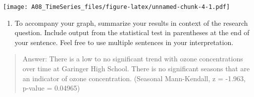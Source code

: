 \documentclass[]{article}
\newenvironment{Shaded}{\begin{snugshade}}{\end{snugshade}}
\newcommand{\CommentTok}[1]{\textcolor[rgb]{0.56,0.35,0.01}{\textit{#1}}}
\newcommand{\DataTypeTok}[1]{\textcolor[rgb]{0.13,0.29,0.53}{#1}}
\newcommand{\DecValTok}[1]{\textcolor[rgb]{0.00,0.00,0.81}{#1}}
\newcommand{\FloatTok}[1]{\textcolor[rgb]{0.00,0.00,0.81}{#1}}
\newcommand{\KeywordTok}[1]{\textcolor[rgb]{0.13,0.29,0.53}{\textbf{#1}}}
\newcommand{\NormalTok}[1]{#1}
\newcommand{\OperatorTok}[1]{\textcolor[rgb]{0.81,0.36,0.00}{\textbf{#1}}}
\newcommand{\StringTok}[1]{\textcolor[rgb]{0.31,0.60,0.02}{#1}}
\providecommand{\tightlist}{%
  \setlength{\itemsep}{0pt}\setlength{\parskip}{0pt}}
\begin{document}
\begin{Shaded}
\end{Shaded}

\texttt{[image: A08\_TimeSeries\_files/figure-latex/unnamed-chunk-4-1.pdf]}

\begin{enumerate}
\def\labelenumi{\arabic{enumi}.}
\setcounter{enumi}{13}
\tightlist
\item
  To accompany your graph, summarize your results in context of the
  research question. Include output from the statistical test in
  parentheses at the end of your sentence. Feel free to use multiple
  sentences in your interpretation.
\end{enumerate}

\begin{quote}
Answer: There is a low to no significant trend with ozone concentrations
over time at Garinger High School. There is no significant seasons that
are an indicator of ozone concentration. (Seasonal Mann-Kendall, z =
-1.963, p-value = 0.04965)
\end{quote}
\end{document}
